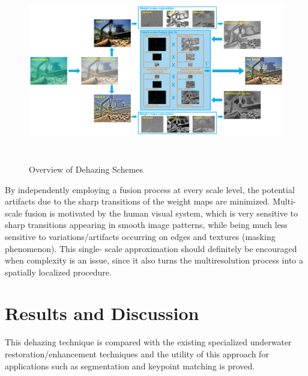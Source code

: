 \documentclass[hidelinks, 12pt]{report}
\begin{document}
\begin{figure}[H]
\centering
\includegraphics[width=16cm,height=8cm]{Dehaze.png}
\caption[Overview of Dehazing Schemes]{Overview of Dehazing Schemes}
\label{Overview of Dehazing Schemes}
\end{figure}
By independently employing a fusion process at every scale level, the potential artifacts due to the sharp transitions of the weight maps are minimized. Multi-scale fusion is motivated by the human visual system, which is very sensitive to sharp transitions appearing in smooth image patterns, while being much less sensitive to variations/artifacts occurring on edges and textures (masking phenomenon). This single- scale approximation should definitely be encouraged when complexity is an issue, since it also turns the multiresolution process into a spatially localized procedure.

\chapter{Results and Discussion}
This dehazing technique is compared with the existing specialized underwater restoration/enhancement techniques and the utility of this approach for applications such as segmentation and keypoint matching is proved.
\end{document}
